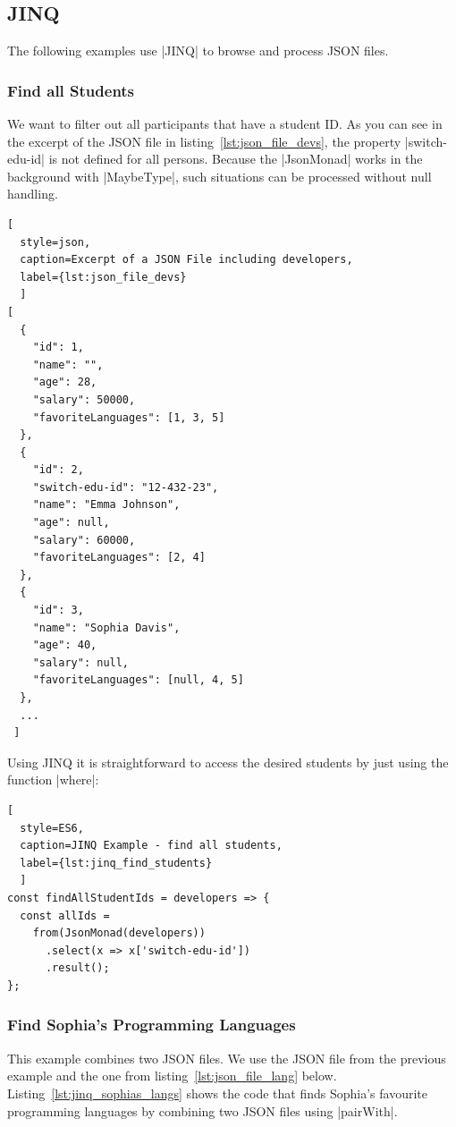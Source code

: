 \subsection{JINQ}
\label{sub:results JINQ}
The following examples use |JINQ| to browse and process JSON files.

\subsubsection{Find all Students}
\label{subsub:Find all Students}
We want to filter out all participants that have a student ID. As you can see
in the excerpt of the JSON file in listing~\ref{lst:json_file_devs}, the
property |switch-edu-id| is not defined for all persons. Because the
|JsonMonad| works in the background with |MaybeType|, such situations can be
processed without null handling.

\begin{lstlisting}[
  style=json, 
  caption=Excerpt of a JSON File including developers,
  label={lst:json_file_devs}
  ]
[
  {
    "id": 1,
    "name": "",
    "age": 28,
    "salary": 50000,
    "favoriteLanguages": [1, 3, 5]
  },
  {
    "id": 2,
    "switch-edu-id": "12-432-23",
    "name": "Emma Johnson",
    "age": null,
    "salary": 60000,
    "favoriteLanguages": [2, 4]
  },
  {
    "id": 3,
    "name": "Sophia Davis",
    "age": 40,
    "salary": null,
    "favoriteLanguages": [null, 4, 5]
  },
  ...
 ]
\end{lstlisting}

Using JINQ it is straightforward to access the desired students by just using
the function |where|:

\begin{lstlisting}[
  style=ES6, 
  caption=JINQ Example - find all students,
  label={lst:jinq_find_students}
  ]
const findAllStudentIds = developers => {
  const allIds =
    from(JsonMonad(developers))
      .select(x => x['switch-edu-id'])
      .result();
};
\end{lstlisting}

\subsubsection{Find Sophia's Programming Languages}
\label{subsub:Find Sophia's Programming Languages}

This example combines two JSON files. We use the JSON file from the previous
example and the one from listing~\ref{lst:json_file_lang} below.
Listing~\ref{lst:jinq_sophias_langs} shows the code that finds Sophia's 
favourite programming languages by combining two JSON files using |pairWith|. 

